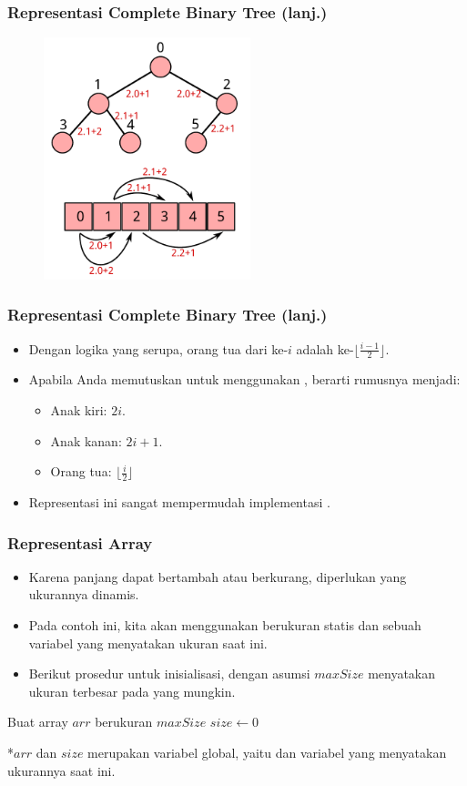 \begin{frame}
\frametitle{Representasi Complete Binary Tree (lanj.)}
\begin{figure}
  \includegraphics[width=6cm]{asset/heap-array.pdf}
\end{figure}
\end{frame}

\begin{frame}
\frametitle{Representasi Complete Binary Tree (lanj.)}
\begin{itemize}
  \item Dengan logika yang serupa, orang tua dari \fnode ke-$i$ adalah \fnode ke-$\lfloor\frac{i-1}{2}\rfloor$.
  \item Apabila Anda memutuskan untuk menggunakan , berarti rumusnya menjadi:
  \begin{itemize}
    \item Anak kiri: $2i$.
    \item Anak kanan: $2i+1$.
    \item Orang tua: $\lfloor \frac{i}{2} \rfloor$
  \end{itemize}
  \item Representasi ini sangat mempermudah implementasi \pbinaryHeap.
\end{itemize}
\end{frame}

\begin{frame}
\frametitle{Representasi Array}
\begin{itemize}
  \item Karena panjang \farray dapat bertambah atau berkurang, diperlukan \farray yang ukurannya dinamis.
  \item Pada contoh ini, kita akan menggunakan \farray berukuran statis dan sebuah variabel yang menyatakan ukuran \farray saat ini.
  \item Berikut prosedur untuk inisialisasi, dengan asumsi $maxSize$ menyatakan ukuran terbesar pada \pheap yang mungkin.
\end{itemize}
\begin{codebox}
\li \Comment Buat array $arr$ berukuran $maxSize$
\li $size \gets 0$
\end{codebox}
*$arr$ dan $size$ merupakan variabel global, yaitu \farray dan variabel yang menyatakan ukurannya saat ini.
\end{frame}


